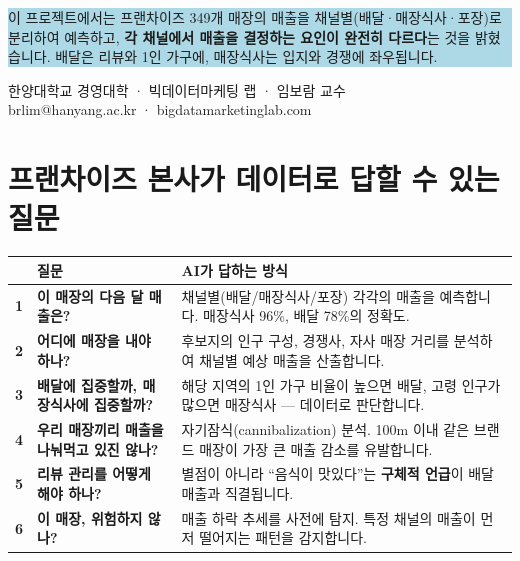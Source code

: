 \documentclass[11pt, a4paper]{article}
\begin{document}
\begin{center}
\begin{minipage}{0.9\textwidth}
\colorbox{lightblue}{%
\begin{minipage}{\textwidth}\vspace{8pt}
\centering
\begin{minipage}{0.85\textwidth}
{\color{darkgray}
이 프로젝트에서는 프랜차이즈 349개 매장의 매출을 채널별(배달·매장식사·포장)로 분리하여 예측하고, \textbf{각 채널에서 매출을 결정하는 요인이 완전히 다르다}는 것을 밝혔습니다. 배달은 리뷰와 1인 가구에, 매장식사는 입지와 경쟁에 좌우됩니다.}
\end{minipage}
\vspace{8pt}
\end{minipage}%
}
\end{minipage}

\vspace{2cm}

{\large\color{darkgray}
한양대학교 경영대학 · 빅데이터마케팅 랩 · 임보람 교수\\[4pt]
brlim@hanyang.ac.kr · bigdatamarketinglab.com}
\end{center}

\newpage

\section{프랜차이즈 본사가 데이터로 답할 수 있는 질문}

\begin{table}[H]
\centering
\renewcommand{\arraystretch}{1.5}
\begin{tabularx}{\textwidth}{C{0.8cm} L{5cm} X}
\toprule
{} & \textbf{질문} & \textbf{AI가 답하는 방식} \\
\midrule
\textbf{1} & \textbf{이 매장의 다음 달 매출은?} & 채널별(배달/매장식사/포장) 각각의 매출을 예측합니다. 매장식사 96\%, 배달 78\%의 정확도. \\[4pt]
\textbf{2} & \textbf{어디에 매장을 내야 하나?} & 후보지의 인구 구성, 경쟁사, 자사 매장 거리를 분석하여 채널별 예상 매출을 산출합니다. \\[4pt]
\textbf{3} & \textbf{배달에 집중할까, 매장식사에 집중할까?} & 해당 지역의 1인 가구 비율이 높으면 배달, 고령 인구가 많으면 매장식사 — 데이터로 판단합니다. \\[4pt]
\textbf{4} & \textbf{우리 매장끼리 매출을 나눠먹고 있진 않나?} & 자기잠식(cannibalization) 분석. 100m 이내 같은 브랜드 매장이 가장 큰 매출 감소를 유발합니다. \\[4pt]
\textbf{5} & \textbf{리뷰 관리를 어떻게 해야 하나?} & 별점이 아니라 ``음식이 맛있다''는 \textbf{구체적 언급}이 배달 매출과 직결됩니다. \\[4pt]
\textbf{6} & \textbf{이 매장, 위험하지 않나?} & 매출 하락 추세를 사전에 탐지. 특정 채널의 매출이 먼저 떨어지는 패턴을 감지합니다. \\
\bottomrule
\end{tabularx}
\end{table}
\end{document}
